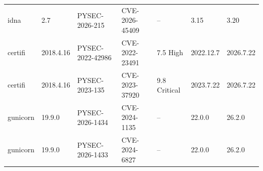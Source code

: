 \documentclass[11pt,a4paper]{article}
\begin{document}
{\begin{longtable}{@{}lllllll@{}}
idna & 2.7 & PYSEC-2026-215 & CVE-2026-45409 & -- & 3.15 & 3.20 \\
certifi & 2018.4.16 & PYSEC-2022-42986 & CVE-2022-23491 & 7.5 High & 2022.12.7 & 2026.7.22 \\
certifi & 2018.4.16 & PYSEC-2023-135 & CVE-2023-37920 & 9.8 Critical & 2023.7.22 & 2026.7.22 \\
gunicorn & 19.9.0 & PYSEC-2026-1434 & CVE-2024-1135 & -- & 22.0.0 & 26.2.0 \\
gunicorn & 19.9.0 & PYSEC-2026-1433 & CVE-2024-6827 & -- & 22.0.0 & 26.2.0 \\
\bottomrule
\end{longtable}
}
\end{document}
